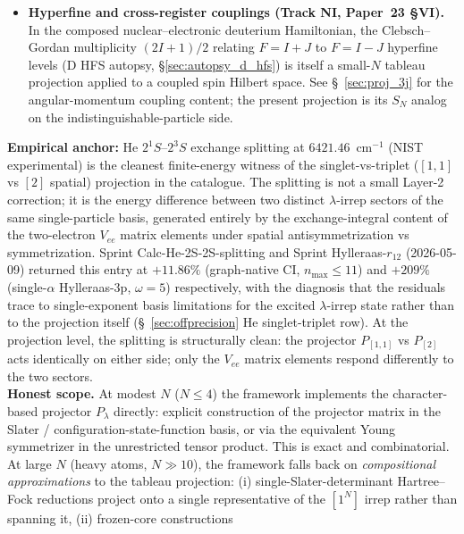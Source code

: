 \documentclass[11pt]{article}
\begin{document}
\begin{itemize}
Paper~16.  The classifier is the boundary at
which the $S_N$ projection becomes computationally explicit in the
production composed-Hamiltonian pipeline.
\item \textbf{Hyperfine and cross-register couplings (Track NI,
Paper~23 §VI).}  In the composed nuclear--electronic deuterium
Hamiltonian, the Clebsch--Gordan multiplicity $(2I+1)/2$ relating
$F = I+J$ to $F = I-J$ hyperfine levels (D HFS autopsy,
\S\ref{sec:autopsy_d_hfs}) is itself a small-$N$ tableau projection
applied to a coupled spin Hilbert space.  See \S~\ref{sec:proj_3j}
for the angular-momentum coupling content; the present projection
is its $S_N$ analog on the indistinguishable-particle side.
\end{itemize}
\textbf{Empirical anchor:} He $2^1 S$--$2^3 S$ exchange splitting at
$6421.46$~cm$^{-1}$ (NIST experimental) is the cleanest finite-energy
witness of the singlet-vs-triplet ($[1,1]$ vs $[2]$ spatial)
projection in the catalogue.  The splitting is not a small Layer-2
correction; it is the energy difference between two distinct
$\lambda$-irrep sectors of the same single-particle basis, generated
entirely by the exchange-integral content of the two-electron $V_{ee}$
matrix elements under spatial antisymmetrization vs symmetrization.
Sprint Calc-He-2S-2S-splitting and Sprint Hylleraas-$r_{12}$
(2026-05-09) returned this entry at $+11.86\%$ (graph-native CI,
$n_{\max} \leq 11$) and $+209\%$ (single-$\alpha$ Hylleraas-3p,
$\omega = 5$) respectively, with the diagnosis that the residuals
trace to single-exponent basis limitations for the excited
$\lambda$-irrep state rather than to the projection itself
(\S~\ref{sec:offprecision} He singlet-triplet row).  At the
projection level, the splitting is structurally clean: the projector
$P_{[1,1]}$ vs $P_{[2]}$ acts identically on either side; only the
$V_{ee}$ matrix elements respond differently to the two sectors.\\
\textbf{Honest scope.}  At modest $N$ ($N \leq 4$) the framework
implements the character-based projector $P_\lambda$ directly:
explicit construction of the projector matrix in the Slater /
configuration-state-function basis, or via the equivalent Young
symmetrizer in the unrestricted tensor product.  This is exact and
combinatorial.  At large $N$ (heavy atoms, $N \gg 10$), the framework
falls back on \emph{compositional approximations} to the tableau
projection: (i) single-Slater-determinant Hartree--Fock reductions
project onto a single representative of the $[1^N]$ irrep rather
than spanning it, (ii) frozen-core constructions
\end{document}
